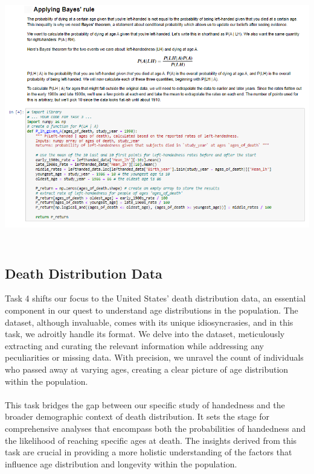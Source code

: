 \documentclass{article}
\begin{document}
\vspace{0.5cm}
        \begin{center}
            \includegraphics[height=320pt]{3.png}\\
        \end{center}
\newpage

\subsection{Death Distribution Data}

Task 4 shifts our focus to the United States' death distribution data, an essential component in our quest to understand age distributions in the population. The dataset, although invaluable, comes with its unique idiosyncrasies, and in this task, we adroitly handle its format. We delve into the dataset, meticulously extracting and curating the relevant information while addressing any peculiarities or missing data. With precision, we unravel the count of individuals who passed away at varying ages, creating a clear picture of age distribution within the population.\\ \\ This task bridges the gap between our specific study of handedness and the broader demographic context of death distribution. It sets the stage for comprehensive analyses that encompass both the probabilities of handedness and the likelihood of reaching specific ages at death. The insights derived from this task are crucial in providing a more holistic understanding of the factors that influence age distribution and longevity within the population.
\end{document}
